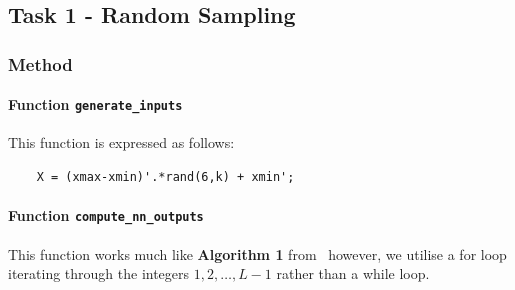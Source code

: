 \documentclass[11pt]{article}
\begin{document}

\subsection{Task 1 - Random Sampling}
\subsubsection{Method}
\paragraph{Function \texttt{generate\_inputs}}
This function is expressed as follows:
\begin{verbatim}
    X = (xmax-xmin)'.*rand(6,k) + xmin';
\end{verbatim}
\paragraph{Function \texttt{compute\_nn\_outputs}}
This function works much like \textbf{Algorithm 1} from~\cite{NNVNotes} however, we utilise a for loop iterating through the integers $1,2,\dots,L-1$ rather than a while loop.
\end{document}
